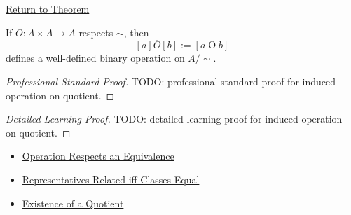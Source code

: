 \newpage
{}
\label{prf:induced-operation-on-quotient}

\begin{remark*}[Return]
\hyperref[thm:induced-operation-on-quotient]{Return to Theorem}
\end{remark*}

\begin{theorem*}
If $O:A\times A\to A$ respects $\sim$, then
\[
[a]\mathbin{\overline{O}}[b]:=[a\mathbin{O}b]
\]
defines a well-defined binary operation on $A/{\sim}$.
\end{theorem*}

\begin{proof}[Professional Standard Proof]
\LRAProofBodyStart
TODO: professional standard proof for induced-operation-on-quotient.
\end{proof}

\begin{proof}[Detailed Learning Proof]
\LRAProofBodyStart
TODO: detailed learning proof for induced-operation-on-quotient.
\end{proof}

\begin{remark*}
\end{remark*}

\begin{dependencies}
\begin{itemize}
  \item \hyperref[def:operation-respects-equivalence]{Operation Respects an Equivalence}
  \item \hyperref[prop:representatives-related-iff-classes-equal]{Representatives Related iff Classes Equal}
  \item \hyperref[thm:existence-of-a-quotient]{Existence of a Quotient}
\end{itemize}
\end{dependencies}

\clearpage
